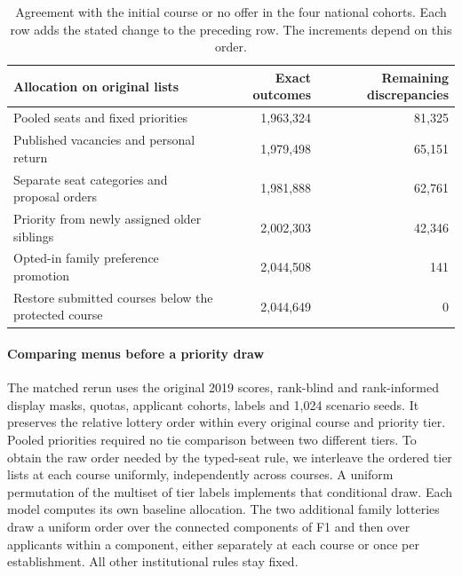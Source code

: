 \begin{table}[ht]\centering\small
\caption{Agreement with the initial course or no offer in the four national cohorts. Each row adds the stated change to the preceding row. The increments depend on this order.}\label{tab:institution-ablation}
\begin{tabular}{@{}lrr@{}}\toprule
Allocation on original lists & Exact outcomes & Remaining discrepancies\\\midrule
Pooled seats and fixed priorities & 1,963,324 & 81,325\\
Published vacancies and personal return & 1,979,498 & 65,151\\
Separate seat categories and proposal orders & 1,981,888 & 62,761\\
Priority from newly assigned older siblings & 2,002,303 & 42,346\\
Opted-in family preference promotion & 2,044,508 & 141\\
Restore submitted courses below the protected course & 2,044,649 & 0\\\bottomrule
\end{tabular}
\end{table}

\paragraph{Comparing menus before a priority draw}
The matched rerun uses the original 2019 scores, rank-blind and rank-informed display masks, quotas, applicant cohorts, labels and 1,024 scenario seeds. It preserves the relative lottery order within every original course and priority tier. Pooled priorities required no tie comparison between two different tiers. To obtain the raw order needed by the typed-seat rule, we interleave the ordered tier lists at each course uniformly, independently across courses. A uniform permutation of the multiset of tier labels implements that conditional draw. Each model computes its own baseline allocation. The two additional family lotteries draw a uniform order over the connected components of F1 and then over applicants within a component, either separately at each course or once per establishment. All other institutional rules stay fixed.

